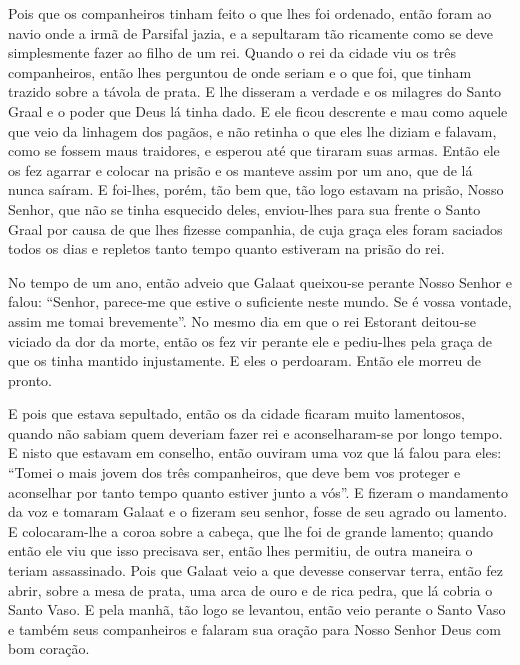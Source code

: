 Pois que os companheiros tinham feito o que lhes foi ordenado, então foram ao
navio onde a irmã de Parsifal jazia, e a sepultaram tão ricamente como se deve
simplesmente fazer ao filho de um rei. Quando o rei da cidade viu os três
companheiros, então lhes perguntou de onde seriam e o que foi, que tinham
trazido sobre a távola de prata. E lhe disseram a verdade e os milagres do
Santo Graal e o poder que Deus lá tinha dado. E ele ficou descrente e mau como
aquele que veio da linhagem dos pagãos, e não retinha o que eles lhe diziam e
falavam, como se fossem maus traidores, e esperou até que tiraram suas armas. 
Então ele os fez agarrar e colocar na prisão e os manteve assim por um ano, que
de lá nunca saíram. E foi-lhes, porém, tão bem que, tão logo estavam na prisão,
Nosso Senhor, que não se tinha esquecido deles, enviou-lhes para sua frente o
Santo Graal por causa de que lhes fizesse companhia, de cuja graça eles foram
saciados todos os dias e repletos tanto tempo quanto estiveram na prisão do
rei.

No tempo de um ano, então adveio que Galaat queixou-se perante Nosso Senhor e
falou: “Senhor, parece-me que estive o suficiente neste mundo. Se é vossa
vontade, assim me tomai brevemente”. No mesmo dia em que o rei Estorant
deitou-se viciado da dor da morte, então os fez vir perante ele e pediu-lhes
pela graça de que os tinha mantido injustamente. E eles o perdoaram.
Então ele morreu de pronto. 

E pois que estava sepultado, então os da cidade ficaram muito lamentosos, quando
não sabiam quem deveriam fazer rei e aconselharam-se por longo tempo. E nisto
que estavam em conselho, então ouviram uma voz que lá falou para eles: “Tomei o
mais jovem dos três companheiros, que deve bem vos proteger e aconselhar por
tanto tempo quanto estiver junto a vós”. E fizeram o mandamento da voz
e tomaram Galaat e o fizeram seu senhor, fosse de seu agrado ou lamento. E
colocaram-lhe a coroa sobre a cabeça, que lhe foi de grande lamento; quando
então ele viu que isso precisava ser, então lhes permitiu, de outra maneira o
teriam assassinado. Pois que Galaat veio a que devesse conservar terra, então
fez abrir, sobre a mesa de prata, uma arca de ouro e de rica pedra, que lá
cobria o Santo Vaso. E pela manhã, tão logo se levantou, então veio perante o
Santo Vaso e também seus companheiros e falaram sua oração para Nosso Senhor
Deus com bom coração. 

